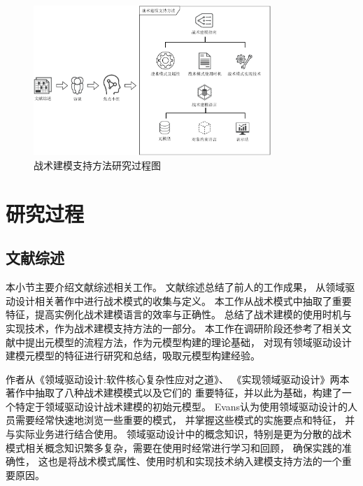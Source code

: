 \begin{figure}[h] %
    \centering %
    \includegraphics[width=0.8\textwidth]{FIGs/chapter3/researchmethod.pdf} %
    \caption{战术建模支持方法研究过程图} %
    \label{researchmethod} %
\end{figure}%

\section{研究过程}

\subsection{文献综述}

本小节主要介绍文献综述相关工作。
文献综述总结了前人的工作成果，
从领域驱动设计相关著作中进行战术模式的收集与定义。
本工作从战术模式中抽取了重要特征，提高实例化战术建模语言的效率与正确性。
总结了战术建模的使用时机与实现技术，作为战术建模支持方法的一部分。
本工作在调研阶段还参考了相关文献中提出元模型的流程方法，作为元模型构建的理论基础，
对现有领域驱动设计建模元模型的特征进行研究和总结，吸取元模型构建经验。

作者从《领域驱动设计:软件核心复杂性应对之道》\cite{DBLP:books/daglib/0013521}、
《实现领域驱动设计》\cite{vernon2013implementing}两本著作中抽取了八种战术建模模式以及它们的
重要特征，并以此为基础，构建了一个特定于领域驱动设计战术建模的初始元模型。
Evans认为使用领域驱动设计的人员需要经常快速地浏览一些重要的模式，
并掌握这些模式的实施要点和特征，
并与实际业务进行结合使用\cite{evans2014domain}。
领域驱动设计中的概念知识，特别是更为分散的战术模式相关概念知识繁多复杂，需要在使用时经常进行学习和回顾，
确保实践的准确性，
这也是将战术模式属性、使用时机和实现技术纳入建模支持方法的一个重要原因。


